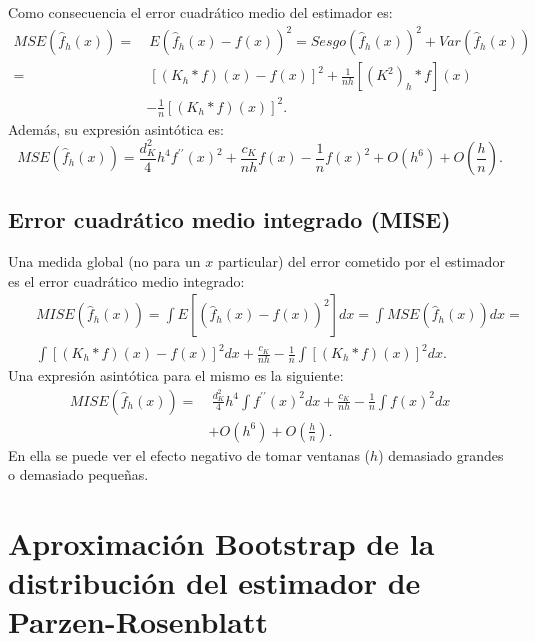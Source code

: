 \documentclass[
]{book}
\theoremstyle{break}
\theoremstyle{nonumberplain}
\begin{document}
Como consecuencia el error cuadrático medio del estimador es:
\[\begin{aligned}
MSE\left( \hat{f}_{h}\left( x \right) \right) =&\ E\left( \hat{f}_{h}\left(
x \right) -f\left( x \right) \right)^2=Sesgo\left( \hat{f}_{h}\left(
x \right) \right)^2+Var\left( \hat{f}_{h}\left( x \right) \right) \\
=&\ \left[ \left( K_{h}\ast f \right) \left( x \right) -f\left( x \right) \right]
^2+\frac{1}{nh}\left[ \left( K^2 \right) _{h}\ast f\right] \left( x \right) \\
&-\frac{1}{n}\left[ \left( K_{h}\ast f \right) \left( x \right) \right]^2.
\end{aligned}\]
Además, su expresión asintótica
es:\[MSE\left( \hat{f}_{h}\left( x \right) \right) =\frac{d_{K}^2}{4}
h^{4}f^{\prime \prime }\left( x \right)^2+\frac{c_{K}}{nh}f\left( x \right)
-\frac{1}{n}f\left( x \right)^2+O\left( h^{6} \right) +O\left( \frac{h}{n}
 \right).\]

\subsection{Error cuadrático medio integrado (MISE)}\label{error-cuadruxe1tico-medio-integrado-mise}

Una medida global (no para un \(x\) particular) del error cometido por el
estimador es el error cuadrático medio integrado:
\[\begin{aligned}
& & MISE\left( \hat{f}_{h}\left( x \right) \right) =\int E\left[ \left( \hat{f}
_{h}\left( x \right) -f\left( x \right) \right)^2\right] dx=\int MSE\left( 
\hat{f}_{h}\left( x \right) \right) dx= \\
&&\int \left[ \left( K_{h}\ast f \right) \left( x \right) -f\left( x \right) 
\right]^2dx+\frac{c_{K}}{nh}-\frac{1}{n}\int \left[ \left( K_{h}\ast
f \right) \left( x \right) \right]^2dx.
\end{aligned}\]
Una expresión asintótica para el mismo es la siguiente:
\[\begin{aligned}
MISE\left( \hat{f}_{h}\left( x \right) \right) =&\ \frac{d_{K}^2}{4}h^4\int
f^{\prime \prime }\left( x \right)^2dx+\frac{c_{K}}{nh}-\frac{1}{n}\int
f\left( x \right)^2dx \\
&+O\left( h^{6} \right) +O \left( \frac{h}{n} \right).
\end{aligned}\]
En ella se puede ver el efecto negativo de tomar ventanas (\(h\)) demasiado
grandes o demasiado pequeñas.

\section{Aproximación Bootstrap de la distribución del estimador de Parzen-Rosenblatt}\label{aproximacion-bootstrap}
\end{document}
